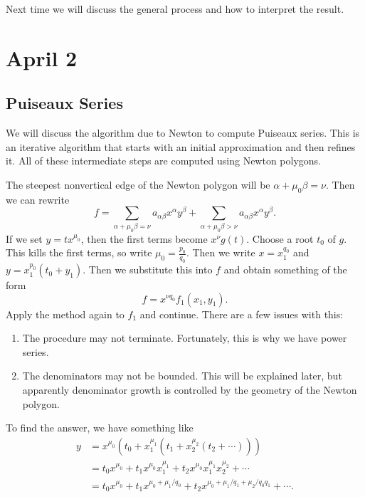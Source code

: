 \documentclass[leqno, openany]{memoir}
\theoremstyle{definition}
\theoremstyle{remark}
\theoremstyle{plain}
\theoremstyle{definition}
\theoremstyle{remark}
\begin{document}
Next time we will discuss the general process and how to interpret the result.

\chapter{April 2}%

\section{Puiseaux Series}%

We will discuss the algorithm due to Newton to compute Puiseaux series. This is
an iterative algorithm that starts with an initial approximation and then
refines it. All of these intermediate steps are computed using Newton polygons.

The steepest nonvertical edge of the Newton polygon will be $\alpha + \mu_0
\beta = \nu$. Then we can rewrite \[ f = \sum_{\alpha + \mu_0 \beta = \nu}
a_{\alpha\beta}x^{\alpha}y^{\beta} + \sum_{\alpha+\mu_0\beta>\nu}
a_{\alpha\beta}x^{\alpha}y^{\beta}. \] If we set $y = tx^{\mu_0}$, then the
first terms become $x^{\nu} g(t)$. Choose a root $t_0$ of $g$. This kills the
first terms, so write $\mu_0 = \frac{p_0}{q_0}$. Then we write $x = x_1^{q_0}$
and $y = x_1^{p_0}(t_0 + y_1)$. Then we substitute this into $f$ and obtain
something of the form \[ f = x^{\nu q_0} f_1(x_1, y_1). \] Apply the method
again to $f_1$ and continue. There are a few issues with this:
\begin{enumerate} \item The procedure may not terminate. Fortunately, this is
    why we have power series.  \item The denominators may not be bounded. This
    will be explained later, but apparently denominator growth is controlled by
    the geometry of the Newton polygon.  \end{enumerate} To find the answer, we
    have something like \begin{align*} y &= x^{\mu_0} (t_0 + x_1^{\mu_1}(t_1 +
        x_2^{\mu_2}(t_2 + \cdots))) \\ &= t_0 x^{\mu_0} + t_1
        x^{\mu_0}x_1^{\mu_1} + t_2 x^{\mu_0} x_1^{\mu_1} x_2^{\mu_2} + \cdots
                                    \\ &= t_0 x^{\mu_0} + t_1 x^{\mu_0 +
                                    \mu_1/q_0} + t_2 x^{\mu_0 + \mu_1/q_1 +
                                \mu_2/q_0q_1} + \cdots.  \end{align*}
\end{document}
